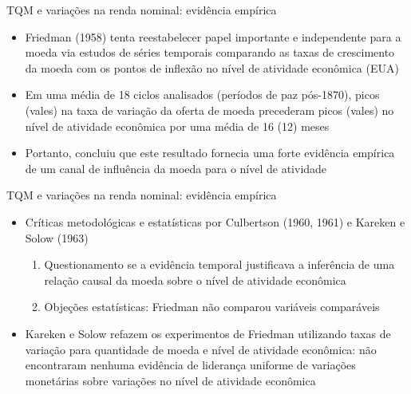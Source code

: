 \documentclass[10pt]{beamer}
\begin{document}
\begin{frame}{TQM e variações na renda nominal: evidência empírica}
    \begin{itemize}
        \item Friedman (1958) tenta reestabelecer papel importante e independente para a moeda via estudos de séries temporais comparando as taxas de crescimento da moeda com os pontos de inflexão no nível de atividade econômica (EUA)
        \bigskip
        \item Em uma média de 18 ciclos analisados (períodos de paz pós-1870), picos (vales) na taxa de variação da oferta de moeda precederam picos (vales) no nível de atividade econômica por uma média de 16 (12) meses
        \bigskip
        \item Portanto, concluiu que este resultado fornecia uma forte evidência empírica de um canal de influência da moeda para o nível de atividade
    \end{itemize}
\end{frame}

\begin{frame}{TQM e variações na renda nominal: evidência empírica}
    \begin{itemize}
        \item Críticas metodológicas e estatísticas por Culbertson (1960, 1961) e Kareken e Solow (1963)
        \bigskip
        \begin{enumerate}
            \item Questionamento se a evidência temporal justificava a inferência de uma relação causal da moeda sobre o nível de atividade econômica
            \bigskip
            \item Objeções estatísticas: Friedman não comparou variáveis comparáveis
        \end{enumerate}
        \bigskip
        \item Kareken e Solow refazem os experimentos de Friedman utilizando taxas de variação para quantidade de moeda e nível de atividade econômica: não encontraram nenhuma evidência de liderança uniforme de variações monetárias sobre variações no nível de atividade econômica
    \end{itemize}
\end{frame}
\end{document}
